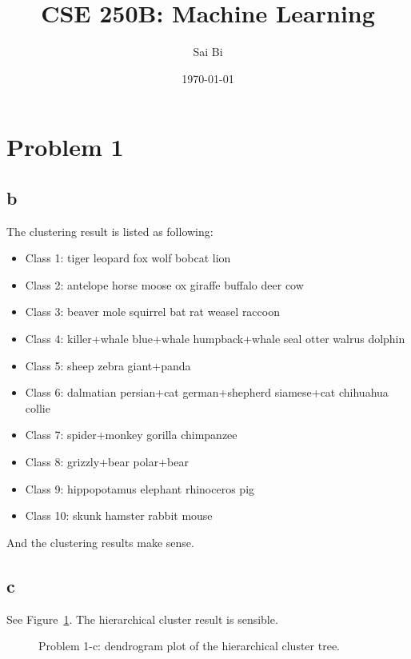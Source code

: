 \documentclass[a4paper,11pt]{article}
\theoremstyle{mytheor}
\begin{document}
\title{CSE 250B: Machine Learning}

\author{Sai Bi}

\date{\today}

\maketitle

\section*{Problem 1}
\subsection*{b}
The clustering result is listed as following:
\begin{itemize}
	\item Class 1: tiger leopard fox wolf bobcat lion 
	\item Class 2: antelope horse moose ox giraffe buffalo deer cow 
	\item Class 3: beaver mole squirrel bat rat weasel raccoon 
	\item Class 4: killer+whale blue+whale humpback+whale seal otter walrus dolphin 
    \item Class 5: sheep zebra giant+panda 
    \item Class 6: dalmatian persian+cat german+shepherd siamese+cat chihuahua collie 
   
    \item Class 7:    spider+monkey gorilla chimpanzee 
    
    \item Class 8: grizzly+bear polar+bear 
    
    \item Class 9: hippopotamus elephant rhinoceros pig 
    
    \item Class 10: skunk hamster rabbit mouse 
\end{itemize}
And the clustering results make sense.

\subsection*{c}
See Figure~\ref{fig:1c}. The hierarchical cluster result is sensible.
\begin{figure}
     \caption{Problem 1-c: dendrogram plot of the hierarchical cluster tree.}
     \label{fig:1c}
\end{figure}
\end{document}
